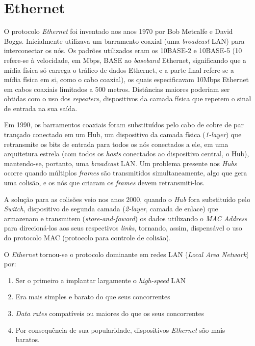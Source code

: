 \hypertarget{ethernet}{%
\section{Ethernet}\label{ethernet}}

O protocolo \emph{Ethernet} foi inventado nos anos 1970 por Bob Metcalfe
e David Boggs. Inicialmente utilizava um barramento coaxial (uma
\emph{broadcast} LAN) para interconectar os nós. Os padrões utilizados
eram os 10BASE-2 e 10BASE-5 (10 refere-se à velocidade, em Mbps, BASE ao
\emph{baseband} Ethernet, significando que a mídia física só carrega o
tráfico de dados Ethernet, e a parte final refere-se a mídia física em
si, como o cabo coaxial), os quais especificavam 10Mbps Ethernet em
cabos coaxiais limitados a 500 metros. Distâncias maiores poderiam ser
obtidas com o uso dos \emph{repeaters}, dispositivos da camada física
que repetem o sinal de entrada na sua saída.

Em 1990, os barramentos coaxiais foram substituídos pelo cabo de cobre
de par trançado conectado em um Hub, um dispositivo da camada física
(\emph{1-layer}) que retransmite os bits de entrada para todos os nós
conectados a ele, em uma arquitetura estrela (com todos os \emph{hosts}
conectados ao dispositivo central, o Hub), mantendo-se, portanto, uma
\emph{broadcast} LAN. Um problema presente nos \emph{Hubs} ocorre quando
múltiplos \emph{frames} são transmitidos simultaneamente, algo que gera
uma colisão, e os nós que criaram os \emph{frames} devem
retransmiti-los.

A solução para as colisões veio nos anos 2000, quando o \emph{Hub} fora
substituído pelo \emph{Switch}, dispositivo de segunda camada
(\emph{2-layer}, camada de enlace) que armazenam e transmitem
(\emph{store-and-foward}) os dados utilizando o \emph{MAC Address} para
direcioná-los aos seus respectivos \emph{links}, tornando, assim,
dispensável o uso do protocolo MAC (protocolo para controle de colisão).

O \emph{Ethernet} tornou-se o protocolo dominante em redes LAN
(\emph{Local Area Network}) por:

\begin{enumerate}
\def\labelenumi{\arabic{enumi}.}
\tightlist
\item
  Ser o primeiro a implantar largamente o \emph{high-speed} LAN
\item
  Era mais simples e barato do que seus concorrentes
\item
  \emph{Data rates} compatíveis ou maiores do que os seus concorrentes
\item
  Por consequência de sua popularidade, dispositivos \emph{Ethernet} são
  mais baratos.
\end{enumerate}


